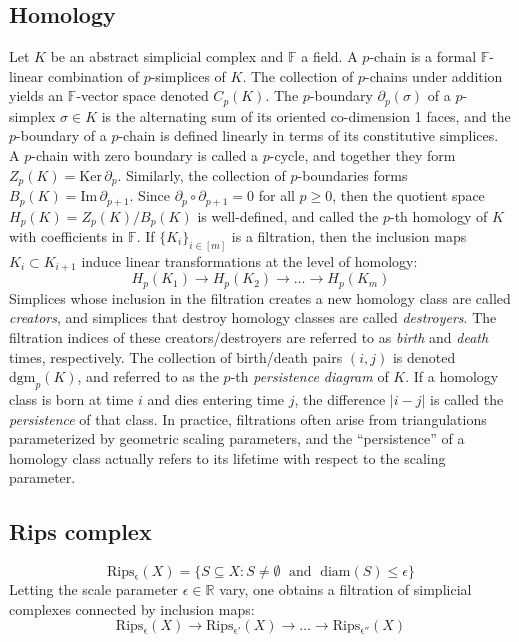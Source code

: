\documentclass[10pt]{article}
\begin{document}
\subsection*{Homology}
Let $K$ be an abstract simplicial complex and $\mathbb{F}$ a field. A $p$-chain is a formal $\mathbb{F}$-linear combination  of $p$-simplices of $K$. The collection of $p$-chains under addition yields an $\mathbb{F}$-vector space denoted $C_p(K)$. 
The $p$-boundary $\partial_p(\sigma)$ of a $p$-simplex $\sigma\in K$ is the alternating sum of its oriented co-dimension 1 faces, and the $p$-boundary of a $p$-chain is defined linearly in terms of its constitutive simplices. 
A $p$-chain with zero boundary is called a $p$-cycle, and together they form $Z_p(K) = \mathrm{Ker}\,\partial_p$. Similarly, the collection of $p$-boundaries forms  $B_p(K) = \mathrm{Im}\,\partial_{p+1}$. Since $\partial_p \circ \partial_{p+1} = 0$ for all $p\geq 0$, then the quotient space $H_p(K) = Z_p(K) / B_{p}(K)$ is well-defined, and called the $p$-th homology of $K$ with coefficients in $\mathbb{F}$. 
If $\{K_i\}_{i\in [m]}$ is a filtration, then the inclusion maps  $K_i\subset K_{i+1}$ induce linear transformations 
at the level of homology:
\begin{equation}
	H_p(K_1) \to H_p(K_2) \to \dots \to H_p(K_m)
\end{equation}
Simplices whose inclusion in the filtration creates a new homology class are   called \emph{creators}, and simplices that destroy homology classes are   called \emph{destroyers}. 
The filtration indices of 
these creators/destroyers are referred to as \emph{birth} and \emph{death} times, respectively. 
The collection of birth/death  pairs 
$(i,j)$ is denoted $\mathrm{dgm}_p(K)$, 
and referred to as the $p$-th \emph{persistence diagram} of $K$.
If a homology class is born at time $i$ and dies entering time $j$, the difference $\lvert i - j \rvert$ is called the \emph{persistence} of that class.
In practice, filtrations often arise from triangulations parameterized by geometric scaling parameters, and the ``persistence'' of a homology class actually refers to its lifetime with respect to the scaling parameter. 


\subsection*{Rips complex}
\begin{equation}\label{eq:rips}
	\mathrm{Rips_\epsilon}(X) = \{ S \subseteq X : S \neq \emptyset \;\mbox{ and }\;\mathrm{diam}(S) \leq \epsilon \}
\end{equation} 
Letting the scale parameter $\epsilon \in \mathbb{R}$ vary, one obtains a filtration of simplicial complexes connected by inclusion maps: 
$$ \mathrm{Rips_\epsilon}(X) \to \mathrm{Rips_{\epsilon'}}(X) \to \dots \to \mathrm{Rips_{\epsilon''}}(X)$$

\end{document}

